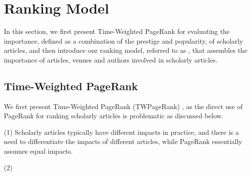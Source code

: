 \section{Ranking Model}
\label{sec-model}

In this section, we first present Time-Weighted PageRank for evaluating  the importance, defined as a combination of the prestige and popularity, of scholarly articles, and then introduce our ranking
model, referred to as \ensemblerank, that assembles the importance of articles, venues and authors involved in scholarly articles.



\subsection{Time-Weighted PageRank}
\label{subsec-twpr}

We first present Time-Weighted PageRank (TWPageRank) , as the direct use of PageRank for ranking scholarly articles is problematic as discussed below.







\noindent(1) Scholarly articles typically have different impacts in practice, and there is a need to differentiate the impacts of different articles, while
 PageRank essentially assumes equal impacts.


\noindent(2) 

